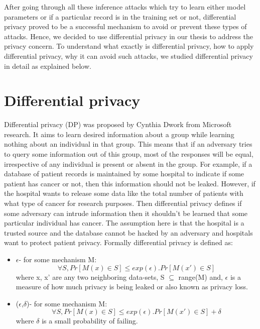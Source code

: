After going through all these inference attacks which try to learn either model parameters or if a particular record is in the training set or not, differential privacy proved to be a successful mechanism to avoid or prevent these types of attacks. Hence, we decided to use differential privacy in our thesis to address the privacy concern. To understand what exactly is differential privacy, how to apply differential privacy, why it can avoid such attacks, we studied differential privacy in detail as explained below.
\section{Differential privacy}
Differential privacy (DP) \cite{3} was proposed by Cynthia Dwork from Microsoft research. It aims to learn desired information about a group while learning nothing about an individual in that group. This means that if an adversary tries to query some information out of this group, most of the responses will be equal, irrespective of any individual is present or absent in the group. For example, if a database of patient records is maintained by some hospital to indicate if some patient has cancer or not, then this information should not be leaked. However, if the hospital wants to release some data like the total number of patients with what type of cancer for research purposes. Then differential privacy defines if some adversary can intrude information then it shouldn't be learned that some particular individual has cancer. The assumption here is that the hospital is a trusted source and the database cannot be hacked by an adversary and hospitals want to protect patient privacy. Formally differential privacy is defined as:
\begin{itemize}
    \item $\epsilon$- for some mechanism M:
        \begin{equation}
            \forall S , Pr[M(x) \in S] \leq exp( \epsilon ) . Pr[M(x') \in S]
        \label{eq:epsDP}
        \end{equation}
    where x, x' are any two neighboring data-sets, S $\subseteq$ range(M) and, $\epsilon$ is a measure of how much privacy is being leaked or also known as privacy loss.
    \item ($\epsilon$,$\delta$)- for some mechanism M:
    \begin{equation}
        \forall S , Pr[M(x) \in S] \leq exp( \epsilon ) . Pr[M(x') \in S] + \delta
    \label{eq:epsdeltaDP}
    \end{equation}
    where $\delta$ is a small probability of failing.
\end{itemize}

